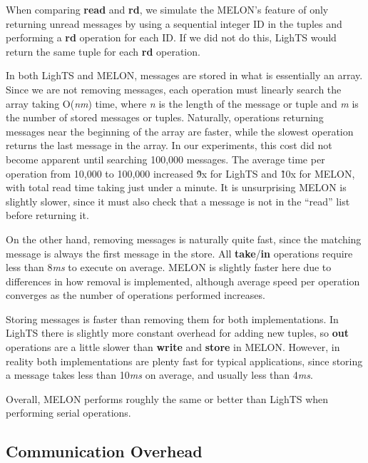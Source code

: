 \documentclass[lnicst]{svmultln}
\begin{document}
When comparing \textbf{read} and \textbf{rd}, we simulate the MELON's feature of only returning unread messages by using a sequential integer ID in the tuples and performing a \textbf{rd} operation for each ID. If we did not do this, LighTS would return the same tuple for each \textbf{rd} operation.

In both LighTS and MELON, messages are stored in what is essentially an array. Since we are not removing messages, each operation must linearly search the array taking O(\textit{nm}) time, where \textit{n} is the length of the message or tuple and \textit{m} is the number of stored messages or tuples. Naturally, operations returning messages near the beginning of the array are faster, while the slowest operation returns the last message in the array. In our experiments, this cost did not become apparent until searching 100,000 messages. The average time per operation from 10,000 to 100,000 increased \~9x for LighTS and \~10x for MELON, with total read time taking just under a minute. It is unsurprising MELON is slightly slower, since it must also check that a message is not in the ``read'' list before returning it.

On the other hand, removing messages is naturally quite fast, since the matching message is always the first message in the store. All \textbf{take}/\textbf{in} operations require less than 8\textit{ms} to execute on average. MELON is slightly faster here due to differences in how removal is implemented, although average speed per operation converges as the number of operations performed increases.

Storing messages is faster than removing them for both implementations. In LighTS there is slightly more constant overhead for adding new tuples, so \textbf{out} operations are a little slower than \textbf{write} and \textbf{store} in MELON.  However, in reality both implementations are plenty fast for typical applications, since storing a message takes less than 10\textit{ms} on average, and usually less than 4\textit{ms}.

Overall, MELON performs roughly the same or better than LighTS when performing serial operations.

\subsection{Communication Overhead}
\end{document}
